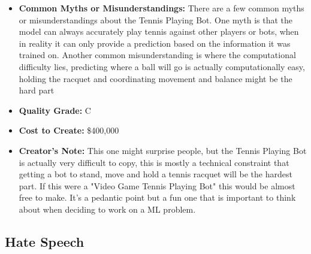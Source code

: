 \begin{itemize}
    \item \textbf{Common Myths or Misunderstandings:} There are a few common myths or misunderstandings about the Tennis Playing Bot. One myth is that the model can always accurately play tennis against other players or bots, when in reality it can only provide a prediction based on the information it was trained on. Another common misunderstanding is where the computational difficulty lies, predicting where a ball will go is actually computationally easy, holding the racquet and coordinating movement and balance might be the hard part 
    \item \textbf{Quality Grade:} C
    \item \textbf{Cost to Create:} \$400,000
    \item \textbf{Creator's Note:} This one might surprise people, but the Tennis Playing Bot is actually very difficult to copy, this is mostly a technical constraint that getting a bot to stand, move and hold a tennis racquet will be the hardest part. If this were a "Video Game Tennis Playing Bot" this would be almost free to make. It's a pedantic point but a fun one that is important to think about when deciding to work on a ML problem.
\end{itemize}


\subsection{Hate Speech}

